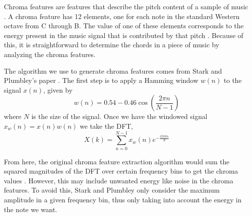 \documentclass[journal]{IEEEtran}
\begin{document}
Chroma features are features that describe the pitch content of a sample of music \cite{jiang}.
A chroma feature has 12 elements, one for each note in the standard Western octave from C through B.
The value of one of these elements corresponds to the energy present in the music signal that is contributed by that pitch \cite{jiang}.
Because of this, it is straightforward to determine the chords in a piece of music by analyzing the chroma features.

The algorithm we use to generate chroma features comes from Stark and Plumbley’s paper \cite{stark}.
The first step is to apply a Hamming window $w(n)$ to the signal $x(n)$, given by
\begin{equation}
    w(n) = 0.54 - 0.46\cos\!\left(\frac{2\pi n}{N - 1}\right)
    \label{eq:window}
\end{equation}
where $N$ is the size of the signal.
Once we have the windowed signal $x_w(n) = x(n)w(n)$ we take the DFT,
\begin{equation}
    X(k) = \sum_{n = 0}^{N - 1}x_w(n)e^{-\frac{i2\pi kn}{N}}
    \label{eq:dft}
\end{equation}

From here, the original chroma feature extraction algorithm would sum the squared magnitudes of the DFT over certain frequency bins to get the chroma values \cite{fujishima}.
However, this may include unwanted energy like noise in the chroma features.
To avoid this, Stark and Plumbley only consider the maximum amplitude in a given frequency bin, thus only taking into account the energy in the note we want.
\end{document}
